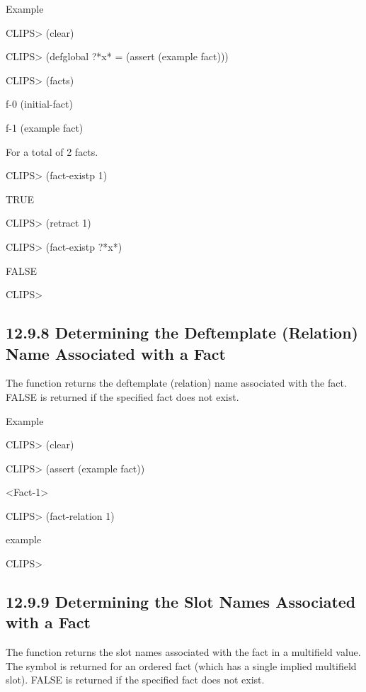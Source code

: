 \documentclass[letterpaper,10pt,english]{sphinxmanual}
\begin{document}
Example

CLIPS\textgreater{} (clear)

CLIPS\textgreater{} (defglobal ?*x* = (assert (example fact)))

CLIPS\textgreater{} (facts)

f-0 (initial-fact)

f-1 (example fact)

For a total of 2 facts.

CLIPS\textgreater{} (fact-existp 1)

TRUE

CLIPS\textgreater{} (retract 1)

CLIPS\textgreater{} (fact-existp ?*x*)

FALSE

CLIPS\textgreater{}


\subsection{12.9.8 Determining the Deftemplate (Relation) Name Associated with a Fact}
\label{\detokenize{actions:determining-the-deftemplate-relation-name-associated-with-a-fact}}
The  function returns the deftemplate (relation) name
associated with the fact. FALSE is returned if the specified fact does
not exist.


\begin{sphinxVerbatim}[commandchars=\\\{\}]
 
\end{sphinxVerbatim}

Example

CLIPS\textgreater{} (clear)

CLIPS\textgreater{} (assert (example fact))

\textless{}Fact-1\textgreater{}

CLIPS\textgreater{} (fact-relation 1)

example

CLIPS\textgreater{}


\subsection{12.9.9 Determining the Slot Names Associated with a Fact}
\label{\detokenize{actions:determining-the-slot-names-associated-with-a-fact}}
The  function returns the slot names associated with
the fact in a multifield value. The symbol  is returned for an
ordered fact (which has a single implied multifield slot). FALSE is
returned if the specified fact does not exist.
\end{document}
